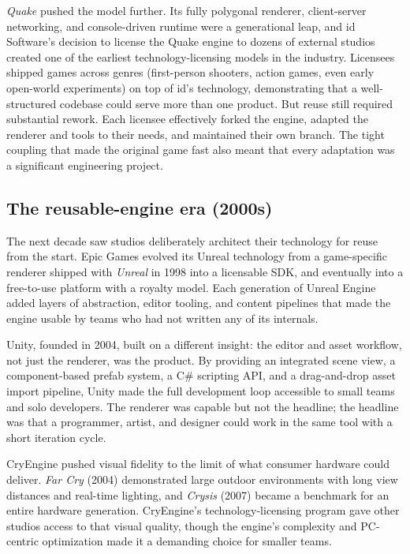 \documentclass[
  11pt,
  letterpaper,
  DIV=11,
  numbers=noendperiod,
  twoside,
  open=right]{scrreprt}
\begin{document}
\emph{Quake} pushed the model further. Its fully polygonal renderer,
client-server networking, and console-driven runtime were a generational
leap, and id Software's decision to license the Quake engine to dozens
of external studios created one of the earliest technology-licensing
models in the industry. Licensees shipped games across genres
(first-person shooters, action games, even early open-world experiments)
on top of id's technology, demonstrating that a well-structured codebase
could serve more than one product. But reuse still required substantial
rework. Each licensee effectively forked the engine, adapted the
renderer and tools to their needs, and maintained their own branch. The
tight coupling that made the original game fast also meant that every
adaptation was a significant engineering project.

\subsection{The reusable-engine era
(2000s)}\label{the-reusable-engine-era-2000s}

The next decade saw studios deliberately architect their technology for
reuse from the start. Epic Games evolved its Unreal technology from a
game-specific renderer shipped with \emph{Unreal} in 1998 into a
licensable SDK, and eventually into a free-to-use platform with a
royalty model. Each generation of Unreal Engine added layers of
abstraction, editor tooling, and content pipelines that made the engine
usable by teams who had not written any of its internals.

Unity, founded in 2004, built on a different insight: the editor and
asset workflow, not just the renderer, was the product. By providing an
integrated scene view, a component-based prefab system, a C\# scripting
API, and a drag-and-drop asset import pipeline, Unity made the full
development loop accessible to small teams and solo developers. The
renderer was capable but not the headline; the headline was that a
programmer, artist, and designer could work in the same tool with a
short iteration cycle.

CryEngine pushed visual fidelity to the limit of what consumer hardware
could deliver. \emph{Far Cry} (2004) demonstrated large outdoor
environments with long view distances and real-time lighting, and
\emph{Crysis} (2007) became a benchmark for an entire hardware
generation. CryEngine's technology-licensing program gave other studios
access to that visual quality, though the engine's complexity and
PC-centric optimization made it a demanding choice for smaller teams.
\end{document}
